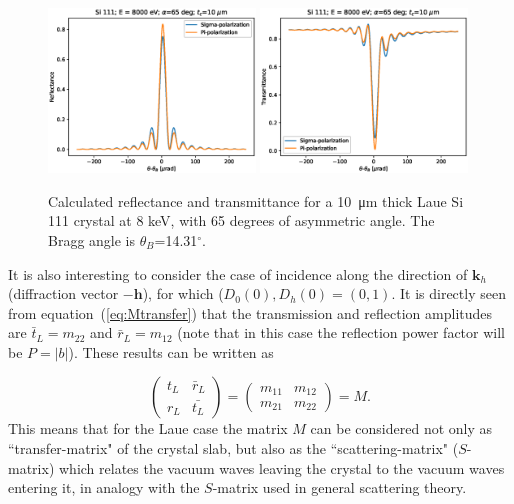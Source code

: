 \documentclass[preprint]{iucr}              %
\newcommand{\inblue}[1]{{\color{blue}#1}}
\begin{document}
\begin{figure}\label{fig:laueProfiles}
    \centering
    \includegraphics[width=0.49\textwidth]{figures/Laue_1.eps}
    \includegraphics[width=0.49\textwidth]{figures/Laue_2.eps}
    \caption{Calculated reflectance and transmittance for a \SI{10}{\micro\meter} thick Laue Si 111 crystal at 8 keV, with 65 degrees of asymmetric angle. \inblue{The Bragg angle is $\theta_B$=14.31$^\circ$}.}
\end{figure}

It is also interesting to consider the case of incidence along the direction of $\textbf{k}_h$ (diffraction vector $-\textbf{h}$), for which ($D_0(0), D_h(0)=(0,1)$. It is directly seen from equation~(\ref{eq:Mtransfer}) that the transmission and reflection amplitudes are $\bar{t}_L=m_{22}$ and $\bar{r}_L=m_{12}$ (note that in this case the reflection power factor will be $P=|b|$). These results can be written as

\begin{equation}\label{eq:MtransferLaue}
    \begin{pmatrix}
    t_L & \bar{r}_L\\
    r_L & \bar{t_L}
    \end{pmatrix}
    =
    \begin{pmatrix}
    m_{11} & m_{12}\\
    m_{21} & m_{22}
    \end{pmatrix}
    = M.
\end{equation}
This means that for the Laue case the matrix $M$ can be considered not only as ``transfer-matrix" of the crystal slab, but also as the ``scattering-matrix" ($S$-matrix) which relates the vacuum waves leaving the crystal to the vacuum waves entering it, in analogy with the $S$-matrix used in general scattering theory.  
\end{document}
